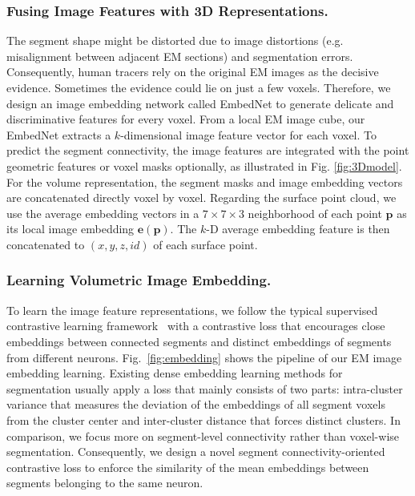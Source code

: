 \subsubsection{Fusing Image Features with 3D Representations.}
The segment shape might be distorted due to image distortions (e.g. misalignment between adjacent EM sections) and segmentation errors. Consequently, human tracers rely on the original EM images as the decisive evidence. Sometimes the evidence could lie on just a few voxels. Therefore, we design an image embedding network called EmbedNet to generate delicate and discriminative features for every voxel. From a local EM image cube, our EmbedNet extracts a $k$-dimensional image feature vector for each voxel. To predict the segment connectivity, the image features are integrated with the point geometric features or voxel masks optionally, as illustrated in Fig. \ref{fig:3Dmodel}. 
For the volume representation, the segment masks and image embedding vectors are concatenated directly voxel by voxel. 
Regarding the surface point cloud, we use the average embedding vectors in a $7 \times 7 \times 3$ neighborhood of each point $\mathbf{p}$ as its local image embedding $\mathbf{e}(\mathbf{p})$.
The $k$-D average embedding feature is then concatenated to $(x,y,z,id)$ of each surface point.

 
\subsubsection{Learning Volumetric Image Embedding.} 
\label{Sec:learn-embedding}
%
To learn the image feature representations, we follow the typical supervised contrastive learning framework~\cite{lee2021learning,de2017semantic,zhou2022rethinking} with a contrastive loss that encourages close embeddings between connected segments and distinct embeddings of segments from different neurons.
Fig.~\ref{fig:embedding} shows the pipeline of our EM image embedding learning. 
%
Existing dense embedding learning methods for segmentation usually apply a loss that mainly consists of two parts: intra-cluster variance that measures the deviation of the embeddings of all segment voxels from the cluster center and inter-cluster distance that forces distinct clusters.
In comparison, we focus more on segment-level connectivity rather than voxel-wise segmentation.  
Consequently, we design a novel segment connectivity-oriented contrastive loss to enforce the similarity of the mean embeddings between segments belonging to the same neuron.
 

